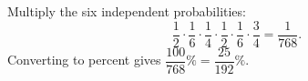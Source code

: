 Multiply the six independent probabilities:
\[\dfrac{1}{2}\cdot\dfrac{1}{6}\cdot\dfrac{1}{4}\cdot\dfrac{1}{2}\cdot\dfrac{1}{6}\cdot\dfrac{3}{4}=\dfrac{1}{768}.\]
Converting to percent gives $\dfrac{100}{768}\%=\boxed{\dfrac{25}{192}\%}$.
